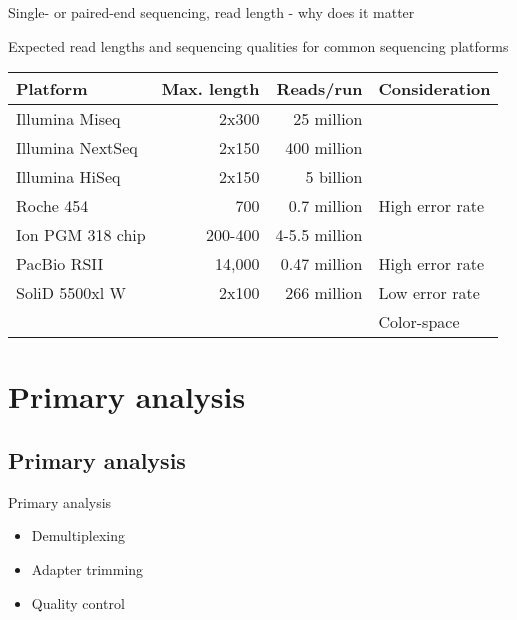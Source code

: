 \documentclass[presentation]{beamer}
\begin{document}
\begin{frame}[label=sec-1-1-4]{Single- or paired-end sequencing, read length - why does it matter}
\begin{center}
\begin{figure}[htb]
{
}
\end{figure}
\end{center}
\end{frame}

\begin{frame}[label=sec-1-1-5]{Expected read lengths and sequencing qualities for common sequencing platforms}
\begin{small}

\begin{center}
\begin{tabular}{l r r l}
\alert{Platform} & \alert{Max. length} & \alert{Reads/run} & \alert{Consideration}\\
\hline
Illumina Miseq & 2x300 & 25 million & \\
\hline
Illumina  NextSeq & 2x150 & 400 million & \\
\hline
Illumina HiSeq & 2x150 & 5 billion & \\
\hline
Roche 454 & 700 & 0.7 million & High error rate\\
\hline
Ion PGM 318 chip & 200-400 & 4-5.5   million & \\
\hline
PacBio RSII & 14,000 & 0.47 million & High error rate\\
\hline
SoliD 5500xl W & 2x100 & 266 million & Low error rate\\
 &  &  & Color-space\\
\end{tabular}
\end{center}

\end{small}
\end{frame}


\section{Primary analysis}
\label{sec-2}
\subsection{Primary analysis}
\label{sec-2-1}
\begin{frame}[label=sec-2-1-1]{Primary analysis}
\begin{itemize}
\item Demultiplexing
\item Adapter trimming
\item Quality control
\end{itemize}
\end{frame}
\end{document}
